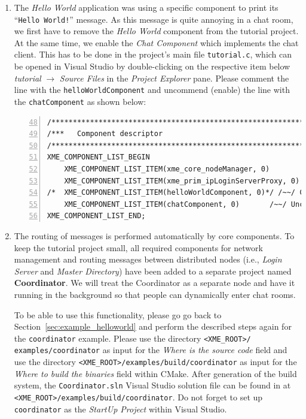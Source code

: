 \begin{enumerate}
	\item The \emph{Hello World} application was using a specific component to print its ``\texttt{Hello World!}'' message.
		As this message is quite annoying in a chat room, we first have to remove the \emph{Hello World} component from the tutorial project.
		At the same time, we enable the \emph{Chat Component} which implements the chat client.
		This has to be done in the project's main file {\tt tutorial.c},
		which can be opened in Visual Studio by double-clicking on the respective item
		below \emph{tutorial} $\rightarrow$ \emph{Source Files} in the \emph{Project Explorer} pane.
		Please comment the line with the {\tt helloWorldComponent}
		and uncommend (enable) the line with the {\tt chatComponent} as shown below:

\begin{lstlisting}[numbers=left,firstnumber=48]
/*************************************************************************/
/***   Component descriptor                                            ***/
/*************************************************************************/
XME_COMPONENT_LIST_BEGIN
	XME_COMPONENT_LIST_ITEM(xme_core_nodeManager, 0)
	XME_COMPONENT_LIST_ITEM(xme_prim_ipLoginServerProxy, 0)
/*	XME_COMPONENT_LIST_ITEM(helloWorldComponent, 0)*/ /~~/ Comment this line
	XME_COMPONENT_LIST_ITEM(chatComponent, 0)       /~~/ Uncomment this line
XME_COMPONENT_LIST_END;
\end{lstlisting}

	\item The routing of messages is performed automatically by \xme core components.
		To keep the tutorial project small, all required components for network management and routing messages
		between distributed nodes (i.e., \emph{Login Server} and \emph{Master Directory}) have been added to a separate project named {\bf Coordinator}.
		We will treat the Coordinator as a separate node and have it running in the background so that people can dynamically enter chat rooms.
		
		To be able to use this functionality, please go go back to Section~\ref{sec:example_helloworld}
		and perform the described steps again for the \verb|coordinator| example.
		Please use the directory \verb|<XME_ROOT>/| \verb|examples/coordinator| as input for the \emph{Where is the source code} field
		and use the directory \verb|<XME_ROOT>/examples/build/coordinator| as input for the
		\emph{Where to build the binaries} field within CMake.
		After generation of the build system, the \verb|Coordinator.sln| Visual Studio solution file
		can be found in at \verb|<XME_ROOT>/examples/build/coordinator|.
		Do not forget to set up \verb|coordinator| as the \emph{StartUp Project} within Visual Studio.
		

\end{enumerate}
